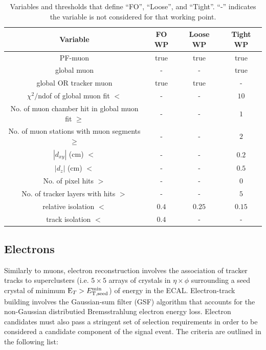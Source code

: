 \begin{table}[!ht]
\centering
\begin{tabular}{|c|c|c|c|}
\hline
  Variable                                          & FO WP & Loose WP & Tight WP \\
\hline
  PF-muon                                           & true  & true     & true   \\
  global muon                                       & -     & -        & true   \\
  global OR tracker muon                            & true  & true     & -      \\
  $\chi^2/$ndof of global muon fit $<$              & -     & -        & $10$   \\
  No. of muon chamber hit in global muon fit $\geq$ & -     & -        & $1$    \\
  No. of muon stations with muon segments $\geq$    & -     & -        & $2$    \\
  $|d_{xy}|$ (cm) $<$                               & -     & -        & $0.2$  \\
  $|d_z|$ (cm) $<$                                  & -     & -        & $0.5$  \\
  No. of pixel hits $>$                             & -     & -        & $0$    \\
  No. of tracker layers with hits $>$               & -     & -        & $5$    \\
  relative isolation $<$                            & $0.4$ & $0.25$   & $0.15$ \\
  track isolation $<$                               & $0.4$ & -        & -      \\
\hline
\end{tabular}
\caption{Variables and thresholds that define ``FO'', ``Loose'', and ``Tight''. ``-'' indicates the variable is not considered for that working point.}
\label{tab:muon_wp}
\end{table}

\subsection{Electrons}
\label{subsec:electrons}
Similarly to muons, electron reconstruction involves the association of tracker tracks to superclusters (i.e. $5\times 5$ arrays of crystals in $\eta\times\phi$ surrounding a seed crystal of minimum ${\mathrm E_{T}}>E^{\text{min}}_{\text{T,seed}}$) of energy in the ECAL. Electron-track building involves the Gaussian-sum filter (GSF) algorithm that accounts for the non-Gaussian distributied Bremsstrahlung electron energy loss. Electron candidates must also pass a stringent set of selection requirements in order to be considered a candidate component of the signal event. The criteria are outlined in the following list:

